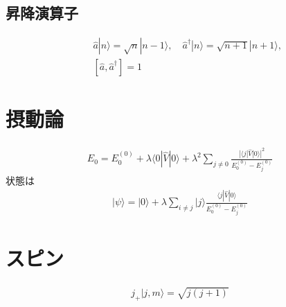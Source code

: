 \documentclass[12pt,dvipdfmx]{jsarticle}
\begin{document}
\subsection*{昇降演算子}
\begin{eqnarray}
  &&\hat{a}|n\rangle = \sqrt{n}|n-1\rangle,\quad \hat{a}^{\dagger}|n\rangle = \sqrt{n+1}|n+1\rangle,\\
  &&\left[\hat{a},\hat{a}^{\dagger}\right]=1
\end{eqnarray}

\section*{\Large{摂動論}}
\begin{eqnarray}
  E_0 = E_0^{(0)}+ \lambda\langle 0|\hat{V}|0\rangle + \lambda^2 \sum_{j\neq 0}\frac{|\langle j|\hat{V}|0\rangle|^2}{E_0^{(0)}-E_j^{(0)}}
\end{eqnarray}
状態は
\begin{eqnarray}
  |\psi\rangle = |0\rangle + \lambda\sum_{i\neq j}|j\rangle \frac{\langle j|\hat{V}|0\rangle}{E_0^{(0)}-E_j^{(0)}}
\end{eqnarray}
\section*{\Large{スピン}}
\begin{eqnarray}
  j_+|j,m\rangle= \sqrt{ j(j+1) }
\end{eqnarray}
\end{document}
